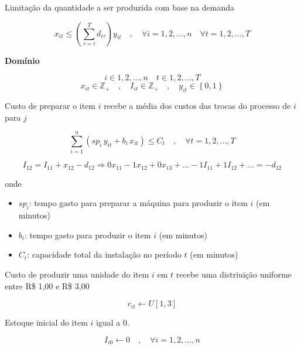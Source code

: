 \documentclass[12pt]{scrartcl}
\begin{document}
Limitação da quantidade a ser produzida com base na demanda 

\[ x_{it} \leq \left(\sum_{\tau = t}^{T} d_{i\tau}\right) y_{it} \quad , \quad \forall i = {1, 2, \dots, n} \quad \forall t = {1, 2, \dots, T} \]

\textbf{Domínio}

\[ i \in {1, 2, \dots, n} \quad t \in {1, 2, \dots, T} \]
\[ x_{it} \in \mathbb{Z}_+ \quad , \quad I_{it} \in \mathbb{Z}_+ \quad , \quad y_{it} \in \left\{0, 1\right\} \]

\newpage

\LARGE

Custo de preparar o item $i$ recebe a média dos custos das trocas do processo de $i$ para $j$

\[ \sum_{i = 1}^{n} \left(sp_i \, y_{it} + b_i \, x_{it}\right) \leq C_t \quad , \quad \forall t = {1, 2, \dots, T} \]

\Large

\[ I_{12} = I_{11} + x_{12} - d_{12} \Longrightarrow 0x_{11} - 1x_{12} + 0x_{13} + \dots - 1 I_{11} + 1 I_{12} + \dots = - d_{12} \]



onde

\begin{itemize}
  \item $sp_i$: tempo gasto para preparar a máquina para produzir o item $i$ (em minutos)
  \item $b_i$: tempo gasto para produzir o item $i$ (em minutos)
  \item $C_t$: capacidade total da instalação no período $t$ (em minutos)
  \end{itemize}

Custo de produzir uma unidade do item $i$ em $t$ recebe uma distriuição uniforme entre R\$ 1,00 e R\$ 3,00 

\[ c_{it} \leftarrow U [1, 3] \]

Estoque inicial do item $i$ igual a $0$.

\[ I_{i0} \leftarrow 0 \quad , \quad \forall i = {1, 2, \dots, n} \]
\end{document}
